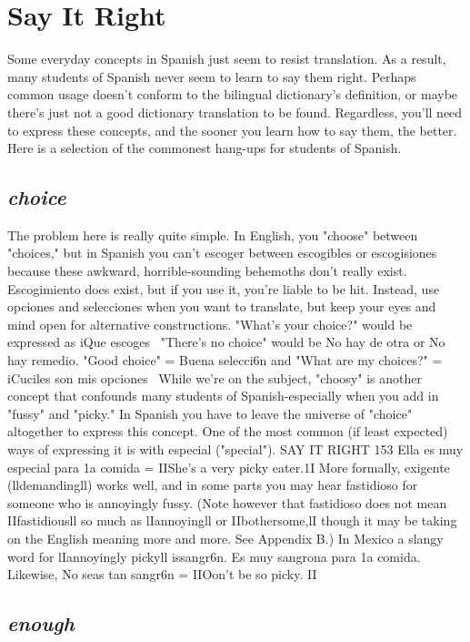 \chapter{Say It Right}

Some everyday concepts in Spanish just seem to resist translation. As a result, many students of Spanish never seem to learn to say
them right. Perhaps common usage doesn't conform to the bilingual
dictionary's definition, or maybe there's just not a good dictionary
translation to be found. Regardless, you'll need to express these concepts, and the sooner you learn how to say them, the better. Here is a
selection of the commonest hang-ups for students of Spanish.

\section{\emph{choice}}

The problem here is really quite simple. In English, you
"choose" between "choices," but in Spanish you can't escoger between
escogibles or escogisiones because these awkward, horrible-sounding
behemoths don't really exist. Escogimiento does exist, but if you use
it, you're liable to be hit. Instead, use opciones and selecciones when
you want to translate, but keep your eyes and mind open for alternative constructions. "What's your choice?" would be expressed as iQue
escoges~ "There's no choice" would be No hay de otra or No hay remedio. "Good choice" = Buena selecci6n and "What are my choices?"
= iCuciles son mis opciones~
While we're on the subject, "choosy" is another concept that
confounds many students of Spanish-especially when you add in
"fussy" and "picky." In Spanish you have to leave the universe of
"choice" altogether to express this concept. One of the most common
(if least expected) ways of expressing it is with especial ("special").
SAY IT RIGHT 153
Ella es muy especial para 1a comida = IIShe's a very picky eater.1I
More formally, exigente (lldemandingll) works well, and in some parts
you may hear fastidioso for someone who is annoyingly fussy. (Note
however that fastidioso does not mean IIfastidiousll so much as lIannoyingll or IIbothersome,lI though it may be taking on the English
meaning more and more. See Appendix B.) In Mexico a slangy word
for lIannoyingly pickyll issangr6n. Es muy sangrona para 1a comida.
Likewise, No seas tan sangr6n = IIOon't be so picky. II

\section{\emph{enough}}

